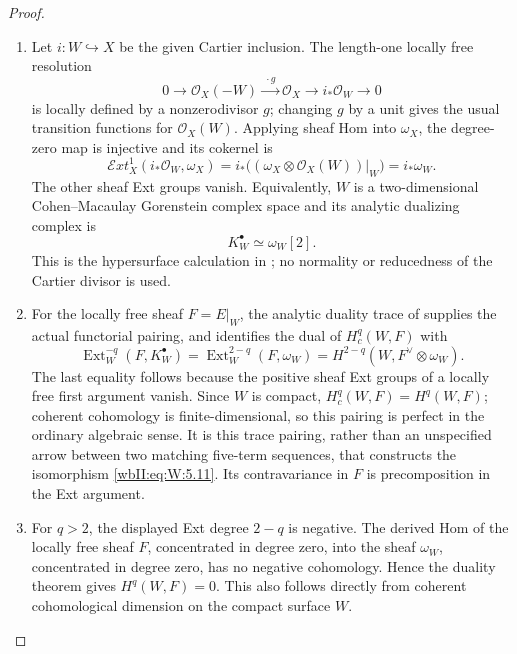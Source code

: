 \begin{proof}

\begin{enumerate}[label={$\langle1\rangle$\arabic*.},leftmargin=*]
\item Let \(i:W\hookrightarrow X\) be the given Cartier inclusion.  The
length-one locally free resolution
\[
 0\longrightarrow\mathcal O_X(-W)
 \xrightarrow{\;\cdot g\;}\mathcal O_X
 \longrightarrow i_*\mathcal O_W\longrightarrow0
\]
is locally defined by a nonzerodivisor \(g\); changing \(g\) by a unit
gives the usual transition functions for \(\mathcal O_X(W)\).
Applying sheaf Hom into \(\omega_X\), the degree-zero map is
injective and its cokernel is
\[
 \mathcal E xt^1_X(i_*\mathcal O_W,\omega_X)
 =i_*\bigl((\omega_X\otimes\mathcal O_X(W))|_W\bigr)
 =i_*\omega_W.
\]
The other sheaf Ext groups vanish.  Equivalently, \(W\) is a
two-dimensional Cohen--Macaulay Gorenstein complex space and its
analytic dualizing complex is
\[
 K_W^\bullet\simeq\omega_W[2].
\]
This is the hypersurface calculation in
\cite[Proposition~2 and pp.~90--91]{RR70push}; no normality or
reducedness of the Cartier divisor is used.

\item For the locally free sheaf \(F=E|_W\), the analytic duality trace of
\cite[Theorem~2, pp.~82--83]{RR70push} supplies the actual
functorial pairing, and identifies the dual of \(H_c^q(W,F)\) with
\[
 \operatorname{Ext}^{-q}_W(F,K_W^\bullet)
 =\operatorname{Ext}^{2-q}_W(F,\omega_W)
 =H^{2-q}(W,F^\vee\otimes\omega_W).
\]
The last equality follows because the positive sheaf Ext groups
of a locally free first argument vanish.  Since \(W\) is compact,
\(H_c^q(W,F)=H^q(W,F)\); coherent cohomology is finite-dimensional,
so this pairing is perfect in the ordinary algebraic sense.
It is this trace pairing, rather than an unspecified arrow between
two matching five-term sequences, that constructs the isomorphism
\eqref{wbII:eq:W:5.11}.  Its contravariance in \(F\) is precomposition in the Ext
argument.

\item For \(q>2\), the displayed Ext degree \(2-q\) is negative.  The
derived Hom of the locally free sheaf \(F\), concentrated in degree
zero, into the sheaf \(\omega_W\), concentrated in degree zero, has
no negative cohomology.  Hence the duality theorem gives
\(H^q(W,F)=0\).  This also follows directly from coherent
cohomological dimension on the compact surface \(W\).

\end{enumerate}
\end{proof}
